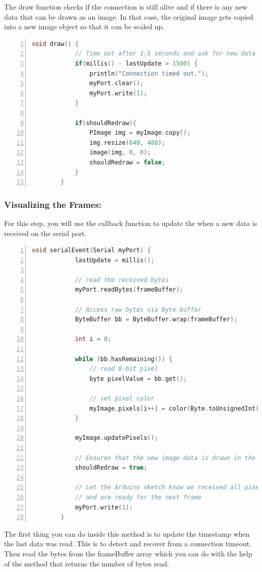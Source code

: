 	The draw function checks if the connection is still alive and if there is any new data that can be drawn as an image. In that case, the original image gets copied into a new image object so that it can be scaled up.
	
	\begin{lstlisting}[language=C++, frame=single, numbers=left, basicstyle=\ttfamily\small]
		void draw() {
			// Time out after 1.5 seconds and ask for new data
			if(millis() - lastUpdate > 1500) {
				println("Connection timed out.");
				myPort.clear();
				myPort.write(1);
			}
			
			if(shouldRedraw){    
				PImage img = myImage.copy();
				img.resize(640, 480);
				image(img, 0, 0);
				shouldRedraw = false;
			}
		}
	\end{lstlisting}
	
	\subsubsection{Visualizing the Frames:} For this step, you will use the  callback function to update the  when a new data is received on the serial port.  \cite{portentaVisionShieldCamera:2024}
	
	\begin{lstlisting}[language=C++, frame=single, numbers=left, basicstyle=\ttfamily\small]
		void serialEvent(Serial myPort) {
			lastUpdate = millis();
			
			// read the received bytes
			myPort.readBytes(frameBuffer);
			
			// Access raw bytes via byte buffer  
			ByteBuffer bb = ByteBuffer.wrap(frameBuffer);
			
			int i = 0;
			
			while (bb.hasRemaining()) {
				// read 8-bit pixel
				byte pixelValue = bb.get();
				
				// set pixel color
				myImage.pixels[i++] = color(Byte.toUnsignedInt(pixelValue));    
			}
			
			myImage.updatePixels();
			
			// Ensures that the new image data is drawn in the next draw loop
			shouldRedraw = true;
			
			// Let the Arduino sketch know we received all pixels
			// and are ready for the next frame
			myPort.write(1);
		}
	\end{lstlisting}
	
	The first thing you can do inside this method is to update the timestamp when the last data was read. This is to detect and recover from a connection timeout. Then read the bytes from the frameBuffer array which you can do with the help of the  method that returns the number of bytes read.
	
